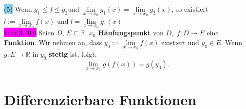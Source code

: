\documentclass[landscape, 10pt]{article}
\newcommand{\R}{\mathbb{R}}
\begin{document}
\begin{multicols}{3}
                     \colorbox{SkyBlue}{(5)} 
                            Wenn \textcolor{NavyBlue}{
                            $g_1\leqslant f\leqslant g_2$}und 
                            \textcolor{NavyBlue}{
                            $\lim\limits_{x\to x_0}g_1(x)
                            =\lim\limits_{x\to x_0}g_2(x)$}, 
                            so existiert 
                            \textcolor{NavyBlue}{
                            $l:=\lim\limits_{x\to x_0}f(x)$} 
                            und \textcolor{NavyBlue}{
                            $l=\lim\limits_{x\to x_0}g_1(x)$}\\
              \colorbox{magenta}{Satz 3.10.6} 
                     Seien \textcolor{NavyBlue}{$D$},
                     \textcolor{NavyBlue}{$E\subseteq\R,\,x_0$} 
                     \textbf{Häufungspunkt} von 
                     \textcolor{NavyBlue}{$D$},\,
                     \textcolor{NavyBlue}{$f:D\longrightarrow E$} 
                     eine \textbf{Funktion}. Wir nehmen an, dass 
                     \textcolor{NavyBlue}{
                     $y_0:=\lim\limits_{x\to x_0}f(x)$} 
                     existiert und 
                     \textcolor{NavyBlue}{$y_0\in E$}. Wenn 
                     \textcolor{NavyBlue}{
                     $g:E\longrightarrow\R$} in 
                     \textcolor{NavyBlue}{$y_0$} 
                     \textbf{stetig} ist, folgt: 
                     \begin{equation*}
                           \lim\limits_{x\to x_0}g(f(x))
                           =g(y_0). 
                     \end{equation*}

\section{Differenzierbare Funktionen}

\end{multicols}
\end{document}
